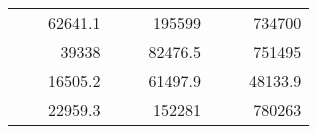 \begin{table}[H]
\begin{tabular}{|ccrccrccc}
\rowcolor[HTML]{DDFDFF} 
\multicolumn{1}{|c|}{\cellcolor[HTML]{FFFFC7}}                                & \multicolumn{1}{c|}{\cellcolor[HTML]{DDFDFF}}                      & \multicolumn{1}{r|}{\cellcolor[HTML]{DAE8FC}62641.1}   & \multicolumn{1}{c|}{\cellcolor[HTML]{FFFFC7}}                                & \multicolumn{1}{c|}{\cellcolor[HTML]{DDFDFF}}                       & \multicolumn{1}{r|}{\cellcolor[HTML]{DDFDFF}195599}    & \multicolumn{1}{c|}{\cellcolor[HTML]{FFFFC7}}                                & \multicolumn{1}{c|}{\cellcolor[HTML]{DDFDFF}}                      & \multicolumn{1}{r|}{\cellcolor[HTML]{DDFDFF}734700}    \\ \cline{3-3} \cline{6-6} \cline{9-9} 
\multicolumn{1}{|c|}{\cellcolor[HTML]{FFFFC7}}                                & \multicolumn{1}{c|}{\cellcolor[HTML]{DDFDFF}}                      & \multicolumn{1}{r|}{\cellcolor[HTML]{DDFDFF}39338}     & \multicolumn{1}{c|}{\cellcolor[HTML]{FFFFC7}}                                & \multicolumn{1}{c|}{\cellcolor[HTML]{DDFDFF}}                       & \multicolumn{1}{r|}{\cellcolor[HTML]{DAE8FC}82476.5}   & \multicolumn{1}{c|}{\cellcolor[HTML]{FFFFC7}}                                & \multicolumn{1}{c|}{\cellcolor[HTML]{DDFDFF}}                      & \multicolumn{1}{r|}{\cellcolor[HTML]{DAE8FC}751495}    \\ \cline{3-3} \cline{6-6} \cline{9-9} 
\rowcolor[HTML]{DDFDFF} 
\multicolumn{1}{|c|}{\cellcolor[HTML]{FFFFC7}}                                & \multicolumn{1}{c|}{\cellcolor[HTML]{DDFDFF}}                      & \multicolumn{1}{r|}{\cellcolor[HTML]{DAE8FC}16505.2}   & \multicolumn{1}{c|}{\cellcolor[HTML]{FFFFC7}}                                & \multicolumn{1}{c|}{\cellcolor[HTML]{DDFDFF}}                       & \multicolumn{1}{r|}{\cellcolor[HTML]{DDFDFF}61497.9}   & \multicolumn{1}{c|}{\cellcolor[HTML]{FFFFC7}}                                & \multicolumn{1}{c|}{\cellcolor[HTML]{DDFDFF}}                      & \multicolumn{1}{r|}{\cellcolor[HTML]{DDFDFF}48133.9}   \\ \cline{3-3} \cline{6-6} \cline{9-9} 
\multicolumn{1}{|c|}{\cellcolor[HTML]{FFFFC7}}                                & \multicolumn{1}{c|}{\cellcolor[HTML]{DDFDFF}}                      & \multicolumn{1}{r|}{\cellcolor[HTML]{DDFDFF}22959.3}   & \multicolumn{1}{c|}{\cellcolor[HTML]{FFFFC7}}                                & \multicolumn{1}{c|}{\cellcolor[HTML]{DDFDFF}}                       & \multicolumn{1}{r|}{\cellcolor[HTML]{DAE8FC}152281}    & \multicolumn{1}{c|}{\cellcolor[HTML]{FFFFC7}}                                & \multicolumn{1}{c|}{\cellcolor[HTML]{DDFDFF}}                      & \multicolumn{1}{r|}{\cellcolor[HTML]{DAE8FC}780263}    \\ \cline{3-3} \cline{6-6} \cline{9-9} 

\end{tabular}
\end{table}
